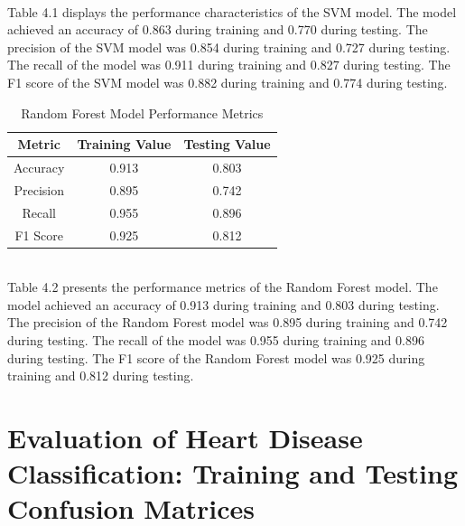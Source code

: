 \\
Table 4.1 displays the performance characteristics of the SVM model. The model achieved an accuracy of 0.863 during training and 0.770 during testing. The precision of the SVM model was 0.854 during training and 0.727 during testing. The recall of the model was 0.911 during training and 0.827 during testing. The F1 score of the SVM model was 0.882 during training and 0.774 during testing.
\\
\begin{table}[h]
\centering
\caption{Random Forest Model Performance Metrics}
\begin{tabular}{|c|c|c|}
\hline
Metric & Training Value & Testing Value \\
\hline
Accuracy & 0.913 & 0.803 \\
\hline
Precision & 0.895 & 0.742 \\
\hline
Recall & 0.955 & 0.896 \\
\hline
F1 Score & 0.925 & 0.812 \\
\hline
\end{tabular}
\end{table}


\\
Table 4.2 presents the performance metrics of the Random Forest model. The model achieved an accuracy of 0.913 during training and 0.803 during testing. The precision of the Random Forest model was 0.895 during training and 0.742 during testing. The recall of the model was 0.955 during training and 0.896 during testing. The F1 score of the Random Forest model was 0.925 during training and 0.812 during testing.
\\
\newpage

\section{Evaluation of Heart Disease Classification: Training and Testing Confusion Matrices}


